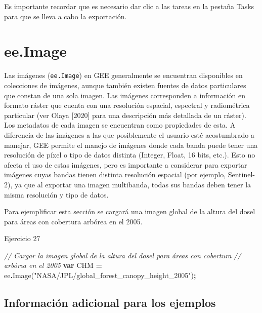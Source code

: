 \documentclass[
  12pt,
  letterpaper,
  twoside]{book}
\newenvironment{Shaded}{\begin{snugshade}}{\end{snugshade}}
\newcommand{\CommentTok}[1]{\textcolor[rgb]{0.56,0.35,0.01}{\textit{#1}}}
\newcommand{\FunctionTok}[1]{\textcolor[rgb]{0.00,0.00,0.00}{#1}}
\newcommand{\KeywordTok}[1]{\textcolor[rgb]{0.13,0.29,0.53}{\textbf{#1}}}
\newcommand{\NormalTok}[1]{#1}
\newcommand{\OperatorTok}[1]{\textcolor[rgb]{0.81,0.36,0.00}{\textbf{#1}}}
\newcommand{\StringTok}[1]{\textcolor[rgb]{0.31,0.60,0.02}{#1}}
\begin{document}
Es importante recordar que es necesario dar clic a las tareas en la pestaña Tasks para que se lleva a cabo la exportación.

\newpage

\hypertarget{ee.image}{%
\chapter{ee.Image}\label{ee.image}}

Las imágenes (\texttt{ee.Image}) en GEE generalmente se encuentran disponibles en colecciones de imágenes, aunque también existen fuentes de datos particulares que constan de una sola imagen. Las imágenes corresponden a información en formato ráster que cuenta con una resolución espacial, espectral y radiométrica particular (ver Olaya {[}2020{]} para una descripción más detallada de un ráster). Los metadatos de cada imagen se encuentran como propiedades de esta. A diferencia de las imágenes a las que posiblemente el usuario esté acostumbrado a manejar, GEE permite el manejo de imágenes donde cada banda puede tener una resolución de píxel o tipo de datos distinta (Integer, Float, 16 bits, etc.). Esto no afecta el uso de estas imágenes, pero es importante a considerar para exportar imágenes cuyas bandas tienen distinta resolución espacial (por ejemplo, Sentinel-2), ya que al exportar una imagen multibanda, todas sus bandas deben tener la misma resolución y tipo de datos.

Para ejemplificar esta sección se cargará una imagen global de la altura del dosel para áreas con cobertura arbórea en el 2005.

Ejercicio 27

\begin{Shaded}
\begin{Highlighting}[]
\CommentTok{// Cargar la imagen global de la altura del dosel para áreas con cobertura }
\CommentTok{// arbórea en el 2005}
\KeywordTok{var}\NormalTok{ CHM }\OperatorTok{=}\NormalTok{ ee}\OperatorTok{.}\FunctionTok{Image}\NormalTok{(}\StringTok{"NASA/JPL/global\_forest\_canopy\_height\_2005"}\NormalTok{)}\OperatorTok{;}
\end{Highlighting}
\end{Shaded}

\hypertarget{informaciuxf3n-adicional-para-los-ejemplos}{%
\section{Información adicional para los ejemplos}\label{informaciuxf3n-adicional-para-los-ejemplos}}
\end{document}
